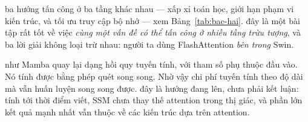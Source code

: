\documentclass[../../../deep_learning.tex]{subfiles}
\begin{document}
\begin{mach}
\item {} \gp ba hướng tấn công ở ba tầng khác nhau --- xấp xỉ toán học, giới hạn phạm vi kiến trúc, và tối ưu truy cập bộ nhớ --- xem Bảng~\ref{tab:bac-hai}. \hq đây là một bài tập rất tốt về việc \emph{cùng một vấn đề có thể tấn công ở nhiều tầng trừu tượng}, và ba lời giải không loại trừ nhau: người ta dùng FlashAttention \emph{bên trong} Swin.
\item {} \gp {} như Mamba \cite{gu2023mamba} quay lại dạng hồi quy tuyến tính, với tham số phụ thuộc đầu vào. Nó tính được bằng phép quét song song. Nhờ vậy chi phí tuyến tính theo độ dài mà vẫn huấn luyện song song được. \gia đây là hướng đang lên, chưa phải kết luận: tính tới thời điểm viết, SSM chưa thay thế attention trong thị giác, và phần lớn kết quả mạnh nhất vẫn thuộc về các kiến trúc dựa trên attention.
\end{mach}

\end{document}
